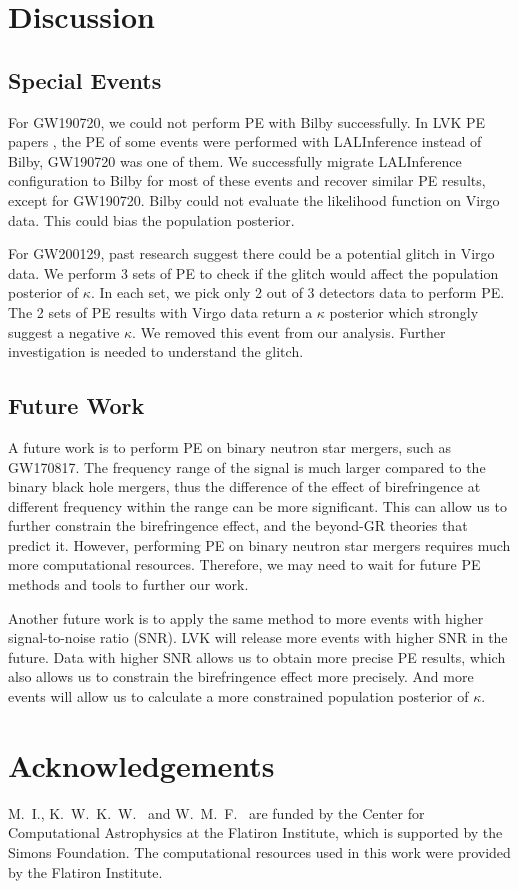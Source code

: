 \documentclass[aps,prd,twocolumn,superscriptaddress,preprintnumbers,floatfix,nofootinbib]{revtex4-2}
\begin{document}
\section{Discussion}
\label{sec:Discussion}

\subsection{Special Events}
For GW190720, we could not perform PE with Bilby successfully.
In LVK PE papers \citep{GWTC-2.1, GWTC-3}, the PE of some events were performed with LALInference \citep{lalsuite} instead of Bilby, GW190720 was one of them.
We successfully migrate LALInference configuration to Bilby for most of these events and recover similar PE results, except for GW190720.
Bilby could not evaluate the likelihood function on Virgo data.
This could bias the population posterior.

For GW200129, past research suggest there could be a potential glitch in Virgo data. \citep{GW200129}
We perform 3 sets of PE to check if the glitch would affect the population posterior of $\kappa$.
In each set, we pick only 2 out of 3 detectors data to perform PE.
The 2 sets of PE results with Virgo data return a $\kappa$ posterior which strongly suggest a negative $\kappa$.
We removed this event from our analysis.
Further investigation is needed to understand the glitch.

\subsection{Future Work}
A future work is to perform PE on binary neutron star mergers, such as GW170817.
The frequency range of the signal is much larger compared to the binary black hole mergers, thus the difference of the effect of birefringence at different frequency within the range can be more significant.
This can allow us to further constrain the birefringence effect, and the beyond-GR theories that predict it.
However, performing PE on binary neutron star mergers requires much more computational resources.
Therefore, we may need to wait for future PE methods and tools to further our work.

Another future work is to apply the same method to more events with higher signal-to-noise ratio (SNR).
LVK will release more events with higher SNR in the future.
Data with higher SNR allows us to obtain more precise PE results, which also allows us to constrain the birefringence effect more precisely.
And more events will allow us to calculate a more constrained population posterior of $\kappa$.

\section{Acknowledgements}
\label{sec:Acknowledgements}
M.~I., K.~W.~K.~W.~ and W.~M.~F.~ are funded by the Center for Computational Astrophysics at the Flatiron Institute, which is supported by the Simons Foundation.
The computational resources used in this work were provided by the Flatiron Institute.


\end{document}
